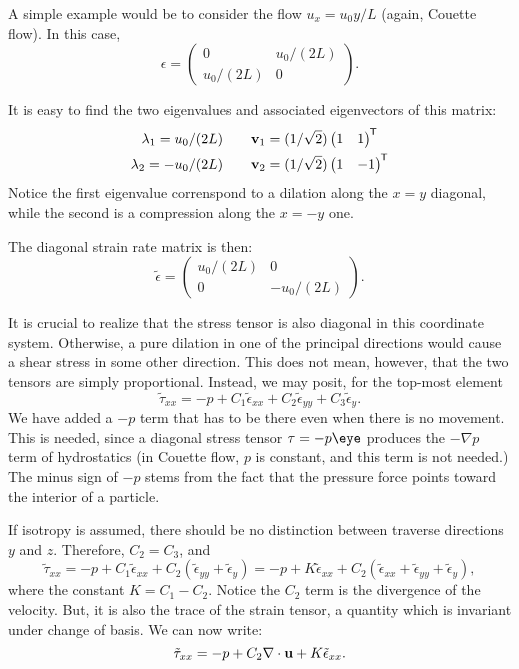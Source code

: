 A simple example would be to consider the flow $u_x = u_0 y / L$
(again, Couette flow). In this case,
\[
\epsilon=
\begin{pmatrix}
  0           &   u_0/(2L)  \\
   u_0/(2L)   &   0
\end{pmatrix} .
\]

It is easy to find the two eigenvalues and associated eigenvectors of
this matrix:
\begin{align*}
  \lambda_1=  u_0/(2L) \qquad &\mathbf{v}_1=(1/\sqrt{2}) \begin{pmatrix} 1 &  1 \end{pmatrix}^{\mkern-1.5mu\mathsf{T}} \\
  \lambda_2= -u_0/(2L) \qquad &\mathbf{v}_2=(1/\sqrt{2})  \begin{pmatrix} 1 &  -1 \end{pmatrix}^{\mkern-1.5mu\mathsf{T}} \\
\end{align*}
Notice the first eigenvalue correnspond to a dilation along the $x=y$
diagonal, while the second is a compression along the $x=-y$ one.

The diagonal strain rate matrix is then:
\[
\tilde{\epsilon}=
\begin{pmatrix}
  u_0/(2L)   & 0 \\
  0          & - u_0/(2L)
\end{pmatrix} .
\]

It is crucial to realize that the stress tensor is also diagonal in
this coordinate system. Otherwise, a pure dilation in one of the
principal directions would cause a shear stress in some other
direction. This does not mean, however, that the two tensors are
simply proportional. Instead, we may posit, for the top-most element
\[
\tilde{\tau}_{xx}=
- p + 
C_1 \tilde{\epsilon}_{xx} +
C_2 \tilde{\epsilon}_{yy} +
C_3 \tilde{\epsilon}_{y} .
\]
We have added a $-p$ term that has to be there even when there is no
movement. This is needed, since a diagonal stress tensor $\tau=-p\eye$
produces the $-\nabla p$ term of hydrostatics (in Couette flow, $p$ is
constant, and this term is not needed.) The minus sign of $-p$ stems
from the fact that the pressure force points toward the interior of a
particle.

If isotropy is assumed, there should be no distinction between
traverse directions $y$ and $z$. Therefore, $C_2=C_3$, and
\[
\tilde{\tau}_{xx}=
- p + 
C_1 \tilde{\epsilon}_{xx} +
C_2 ( \tilde{\epsilon}_{yy} +  \tilde{\epsilon}_{y}  ) =
- p + 
K \tilde{\epsilon}_{xx} +
C_2 ( \tilde{\epsilon}_{xx} + \tilde{\epsilon}_{yy} +  \tilde{\epsilon}_{y}  ) ,
\]
where the constant $K=C_1-C_2$. Notice the $C_2$ term is the
divergence of the velocity. But, it is also the trace of the strain
tensor, a quantity which is invariant under change of basis. We can
now write:
\[
\tilde{\tau}_{xx}=
- p + C_2 \nabla\cdot \mathbf{u} +
K \tilde{\epsilon}_{xx} .
\]

